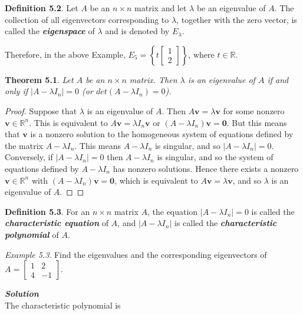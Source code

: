 \documentclass[
  letterpaper,
  DIV=11,
  numbers=noendperiod]{scrartcl}
\theoremstyle{remark}
\begin{document}
\textbf{Definition 5.2}. Let \(A\) be an \(n \times n\) matrix and let
\(\lambda\) be an eigenvalue of \(A\). The collection of all
eigenvectors corresponding to \(\lambda\), together with the zero
vector, is called the \textbf{\emph{eigenspace}} of \(\lambda\) and is
denoted by \(E_{\lambda }\).

Therefore, in the above Example,
\(E_{5} = \left\{t\left[\begin{array}{c} 1 \\ 2 \end{array}\right]\right\}\),
where \(t \in \mathbb{R}\).

\textbf{Theorem 5.1}. \emph{Let \(A\) be an \(n \times n\) matrix. Then
\(\lambda\) is an eigenvalue of \(A\) if and only if
\(|A-\lambda I_{n}| = 0\) (or \(det(A - \lambda I_{n}) = 0\)).}

\begin{proof}
Suppose that \(\lambda\) is an eigenvalue of \(A\). Then
\(A\mathbf{v} = \lambda \mathbf{v}\) for some nonzero
\(\mathbf{v} \in \mathbb{R}^{n}\). This is equivalent to
\(A\mathbf{v} = \lambda I_{n} \mathbf{v}\) or
\((A - \lambda I_{n})\mathbf{v} = \mathbf{0}\). But this means that
\(\mathbf{v}\) is a nonzero solution to the homogeneous system of
equations defined by the matrix \(A - \lambda I_{n}\). This means
\(A - \lambda I_{n}\) is singular, and so \(|A - \lambda I_{n}| = 0\).\\
Conversely, if \(|A - \lambda I_{n}| = 0\) then \(A - \lambda I_{n}\) is
singular, and so the system of equations defined by
\(A - \lambda I_{n}\) has nonzero solutions. Hence there exists a
nonzero \(\mathbf{v} \in \mathbb{R}^{n}\) with
\((A - \lambda I_{n})\mathbf{v} = \mathbf{0}\), which is equivalent to
\(A \mathbf{v} = \lambda \mathbf{v}\), and so \(\lambda\) is an
eigenvalue of \(A\).~◻
\end{proof}

\textbf{Definition 5.3}. For an \(n \times n\) matrix \(A\), the
equation \(|A - \lambda I_{n}| = 0\) is called the
\textbf{\emph{characteristic equation}} of \(A\), and
\(|A - \lambda I_{n}|\) is called the \textbf{\emph{characteristic
polynomial}} of \(A\).

\emph{Example 5.3}. Find the eigenvalues and the corresponding
eigenvectors of \(A = \left[\begin{array}{cc}
        1 & 2 \\
        4 & -1
    \end{array}\right]\).

\textbf{\emph{Solution}}\\
The characteristic polynomial is
\end{document}
